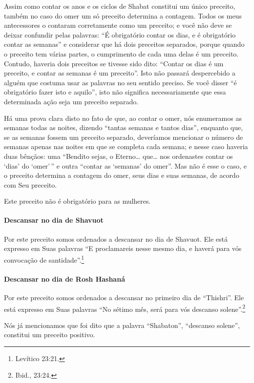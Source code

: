 \begin{multicols}{2}
Assim como contar os anos e os ciclos de Shabat constitui um único
preceito, também no caso do omer\starr{} um só preceito determina a
contagem. Todos os meus antecessores o contaram corretamente como um
preceito; e você não deve se deixar confundir pelas palavras: ``É
obrigatório contar os dias, e é obrigatório contar as semanas'' e
considerar que há dois preceitos separados, porque quando o preceito tem
várias partes, o cumprimento de cada uma delas é um preceito. Contudo,
haveria dois preceitos se tivesse sido dito: ``Contar os dias é um
preceito, e contar as semanas é um preceito''. Isto não passará
despercebido a alguém que costuma usar as palavras no seu sentido
preciso. Se você disser ``é obrigatório fazer isto e aquilo'', isto não
significa necessariamente que essa determinada ação seja um preceito
separado.

Há uma prova clara disto no fato de que, ao contar o omer\starr, nós
enumeramos as semanas todas as noites, dizendo ``tantas semanas e tantos
dias'', enquanto que, se as semanas fossem um preceito separado,
deveríamos mencionar o número de semanas apenas nas noites em que se
completa cada semana; e nesse caso haveria duas bênçãos: uma ``Bendito
sejas, o Eterno\ldots{} que\ldots{} nos ordenastes contar os `dias' do `omer'\,''
e outra ``contar as `semanas' do omer\starr''. Mas não é esse o caso, e o
preceito determina a contagem do omer\starr, seus dias e suas semanas, de
acordo com Seu preceito.

Este preceito não é obrigatório para as mulheres.

\paragraph{Descansar no dia de Shavuot\starr}

Por este preceito somos ordenados a descansar no dia de Shavuot\starr. Ele
está expresso em Suas palavras ``E proclamareis nesse mesmo dia, e
haverá para vós convocação de santidade''.\footnote{Levítico 23:21.}

\paragraph{Descansar no dia de Rosh Hashaná\starr}

Por este preceito somos ordenados a descansar no primeiro dia de
``Thishri''. Ele está expresso em Suas palavras ``No sétimo mês, será
para vós descanso solene''.\footnote{Ibid., 23:24.}

Nós já mencionamos que foi dito que a palavra ``Shabaton'', ``descanso
solene'', constitui um preceito positivo.


\end{multicols}
